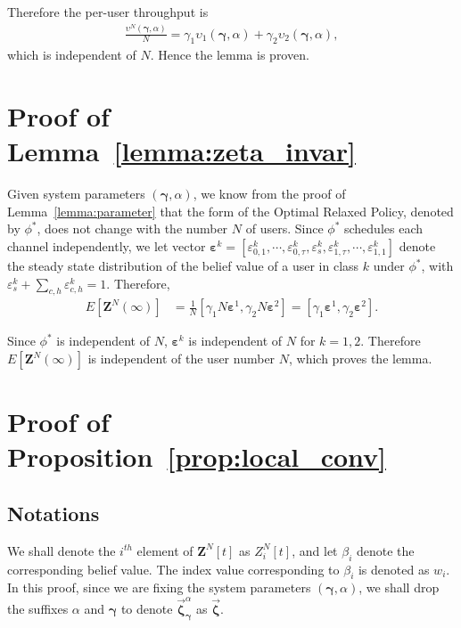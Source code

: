 \documentclass[11pt,twocolumn]{IEEEtran}
\begin{document}
Therefore the per-user throughput is
\begin{align}
\nonumber
\frac{\upsilon^N(\bm \gamma, \alpha)}{N}=\gamma_1 \upsilon_1(\bm \gamma, \alpha)+\gamma_2 \upsilon_2(\bm \gamma, \alpha),
\end{align}
which is independent of $N$. Hence the lemma is proven.

\section{Proof of Lemma~\ref{lemma:zeta_invar}}
\label{appen:zeta_invar}

Given system parameters $(\bm \gamma, \alpha)$, we know from the proof of Lemma~\ref{lemma:parameter} that the form of the Optimal Relaxed Policy, denoted by $\phi^*$, does not change with the number $N$ of users. Since $\phi^*$ schedules each channel independently, we let vector $\bm \varepsilon^k=[ \varepsilon_{0,1}^{k}, \cdots,
\varepsilon_{0,\tau}^{k}, \varepsilon_{s}^{k}, \varepsilon_{1,\tau}^{k},
\cdots,\varepsilon_{1,1}^{k} ]$ denote the steady state distribution of the belief value of a user in class $k$ under $\phi^*$, with $\varepsilon^k_{s}+\sum_{c,h} \varepsilon^k_{c,h}=1$. Therefore,
\begin{align}
E[{\bm Z}^N(\infty)]&= \frac{1}{N}[ \gamma_1 N \bm \varepsilon^1, \gamma_2 N \bm \varepsilon^2 ]=[ \gamma_1 \bm \varepsilon^1, \gamma_2 \bm \varepsilon^2 ]. \nonumber
\end{align}

Since $\phi^*$ is independent of $N$, $\bm \varepsilon^k$ is independent of $N$ for $k=1,2$. Therefore  $E[{\bm Z}^N(\infty)]$ is independent of the user number $N$, which proves the lemma.

\section{Proof of Proposition~\ref{prop:local_conv}}
\label{appen:local}

\subsection{Notations}

We shall denote the $i^{th}$ element of $\bm Z^N[t]$ as $Z^N_i[t]$,  and let $\beta_i$ denote the corresponding belief value. The index value corresponding to $\beta_i$ is denoted as $w_i$. In this proof, since we are fixing the system parameters $(\bm \gamma,\alpha)$, we shall drop the suffixes $\alpha$ and $\bm \gamma$ to denote $\vec{\bm \zeta}^{\alpha}_{\bm \gamma}$ as $\vec{\bm \zeta}$.
\end{document}
